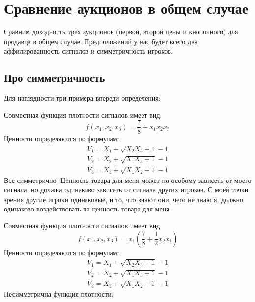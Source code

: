 \chapter{Сравнение аукционов в общем случае}



Сравним доходность трёх аукционов (первой, второй цены и кнопочного) для продавца в общем случае. Предположений у нас будет всего два: аффилированность сигналов и симметричность игроков.

\section{Про симметричность}
Для наглядности три примера впереди определения:

\begin{myex} Совместная функция плотности сигналов имеет вид:
\begin{equation}
f(x_{1},x_{2},x_{3})=\frac{7}{8}+x_{1}x_{2}x_{3}
\end{equation}
Ценности определяются по формулам:
\begin{equation}
\begin{array}{c}
V_{1}=X_{1}+\sqrt{X_{2}X_{3}+1}-1 \\
V_{2}=X_{2}+\sqrt{X_{1}X_{3}+1}-1 \\
V_{3}=X_{3}+\sqrt{X_{1}X_{2}+1}-1
\end{array}
\end{equation}
Все симметрично. Ценность товара для меня может по-особому зависеть от моего сигнала, но должна одинаково зависеть от сигнала других игроков. С моей точки зрения другие игроки одинаковые, и то, что знают они, чего не знаю я, должно одинаково воздействовать на ценность товара для меня.
\end{myex}


\begin{myex} Совместная функция плотности сигналов имеет вид
\begin{equation}
f(x_{1},x_{2},x_{3})=x_{1}\left(\frac{7}{8}+\frac{1}{2}x_{2}x_{3}\right)
\end{equation}
Ценности определяются по формулам:
\begin{equation}
\begin{array}{c}
V_{1}=X_{1}+\sqrt{X_{2}X_{3}+1}-1 \\
V_{2}=X_{2}+\sqrt{X_{1}X_{3}+1}-1 \\
V_{3}=X_{3}+\sqrt{X_{1}X_{2}+1}-1
\end{array}
\end{equation}
Несимметрична функция плотности.
\end{myex}

